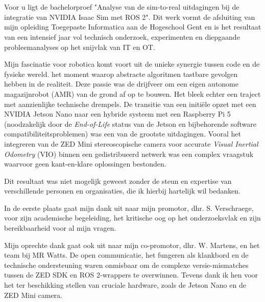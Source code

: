 
\chapter*{}%
\label{ch:voorwoord}

Voor u ligt de bachelorproef "Analyse van de sim-to-real uitdagingen bij de integratie van NVIDIA Isaac Sim met ROS 2". Dit werk vormt de afsluiting van mijn opleiding Toegepaste Informatica aan de Hogeschool Gent en is het resultaat van een intensief jaar vol technisch onderzoek, experimenten en diepgaande probleemanalyses op het snijvlak van IT en OT.

Mijn fascinatie voor robotica komt voort uit de unieke synergie tussen code en de fysieke wereld. het moment waarop abstracte algoritmen tastbare gevolgen hebben in de realiteit. Deze passie was de drijfveer om een eigen autonome magazijnrobot (AMR) van de grond af op te bouwen. Het bleek echter een traject met aanzienlijke technische drempels. De transitie van een initiële opzet met een NVIDIA Jetson Nano naar een hybride systeem met een Raspberry Pi 5 (noodzakelijk door de \textit{End-of-Life} status van de Jetson en bijbehorende software compatibiliteitsproblemen) was een van de grootste uitdagingen. Vooral het integreren van de ZED Mini stereoscopische camera voor accurate \textit{Visual Inertial Odometry} (VIO) binnen een gedistribueerd netwerk was een complex vraagstuk waarvoor geen kant-en-klare oplossingen bestonden.

Dit resultaat was niet mogelijk geweest zonder de steun en expertise van verschillende personen en organisaties, die ik hierbij hartelijk wil bedanken.

In de eerste plaats gaat mijn dank uit naar mijn promotor, dhr. S. Verschraege, voor zijn academische begeleiding, het kritische oog op het onderzoeksvlak en zijn bereikbaarheid voor al mijn vragen.

Mijn oprechte dank gaat ook uit naar mijn co-promotor, dhr. W. Martens, en het team bij MR Watts. De open communicatie, het fungeren als klankbord en de technische ondersteuning waren onmisbaar om de complexe versie-mismatches tussen de ZED SDK en ROS 2-wrappers te overwinnen. Tevens dank ik hen voor het ter beschikking stellen van cruciale hardware, zoals de Jetson Nano en de ZED Mini camera.

